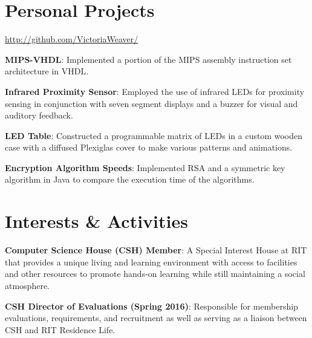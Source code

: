 \documentclass[a4paper,margin,line]{resume}
\begin{document}
\begin{resume}
\section{\mysidestyle Personal Projects}
    \begin{asparablank}
        \item \href{http://github.com/VictoriaWeaver/}{http://github.com/VictoriaWeaver/}\\
        \item \textbf{MIPS-VHDL}: Implemented a portion of the MIPS assembly instruction set 
            architecture in VHDL.\\
        \item \textbf{Infrared Proximity Sensor}: Employed the use of infrared LEDs for proximity 
            sensing in conjunction with seven segment displays and a buzzer for visual and auditory 
            feedback.\\
        \item \textbf{LED Table}: Constructed a programmable matrix of LEDs in a custom wooden 
            case with a diffused Plexiglas cover to make various patterns and animations.\\
        \item \textbf{Encryption Algorithm Speeds}: Implemented RSA and a symmetric key algorithm 
            in Java to compare the execution time of the algorithms.
    \end{asparablank}

\section{\mysidestyle Interests \& Activities}
    \begin{asparablank}
        \item \textbf{Computer Science House (CSH) Member}: A Special Interest House at RIT that
            provides a unique living and learning environment with access to facilities and other resources to promote
            hands-on learning while still maintaining a social atmosphere.\\
        \item \textbf{CSH Director of Evaluations (Spring 2016)}: Responsible for membership evaluations, requirements, and recruitment 
            as well as serving as a liaison between CSH and RIT Residence Life.
    \end{asparablank}
\end{resume}
\end{document}
